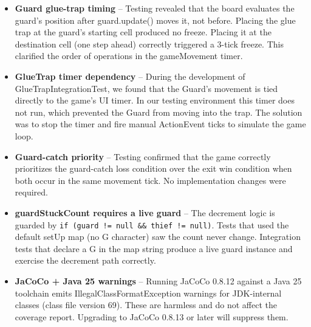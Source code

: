 \documentclass[12pt]{article}
\begin{document}
\begin{itemize}

\item \textbf{Guard glue-trap timing} -- Testing revealed that the board evaluates the guard's position after guard.update() moves it, not before. Placing the glue trap at the guard's starting cell produced no freeze. Placing it at the destination cell (one step ahead) correctly triggered a 3-tick freeze. This clarified the order of operations in the gameMovement timer.

\item \textbf{GlueTrap timer dependency} -- During the development of GlueTrapIntegrationTest, we found that the Guard's movement is tied directly to the game's UI timer. In our testing environment this timer does not run, which prevented the Guard from moving into the trap. The solution was to stop the timer and fire manual ActionEvent ticks to simulate the game loop.

\item \textbf{Guard-catch priority} -- Testing confirmed that the game correctly prioritizes the guard-catch loss condition over the exit win condition when both occur in the same movement tick. No implementation changes were required.

\item \textbf{guardStuckCount requires a live guard} -- The decrement logic is guarded by \texttt{if (guard != null \&\& thief != null)}. Tests that used the default setUp map (no G character) saw the count never change. Integration tests that declare a G in the map string produce a live guard instance and exercise the decrement path correctly.

\item \textbf{JaCoCo + Java 25 warnings} -- Running JaCoCo 0.8.12 against a Java 25 toolchain emits IllegalClassFormatException warnings for JDK-internal classes (class file version 69). These are harmless and do not affect the coverage report. Upgrading to JaCoCo 0.8.13 or later will suppress them.

\end{itemize}

\end{document}

